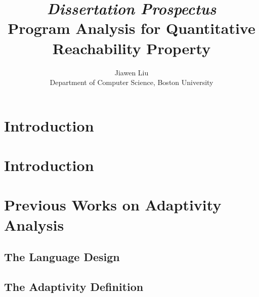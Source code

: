 \documentclass[a4paper,11pt]{article}
\begin{document}
\title{{\em Dissertation Prospectus}
\\
{Program Analysis for Quantitative Reachability Property}
}

\author{Jiawen Liu\\ Department of Computer Science, Boston University}
\maketitle
\begin{abstract}

\end{abstract}

\clearpage
\tableofcontents{}

\clearpage
\section{Introduction }
\label{sec:introduction}


\section*{ }
%

\section{Introduction }
\label{sec:adapt-intro}


\section{Previous Works on Adaptivity Analysis }
\label{sec:prework}

\subsection{The Language Design}
\label{sec:prework-language}

%
\subsection{The Adaptivity Definition}
\label{sec:prework-formalization}

%
\end{document}
